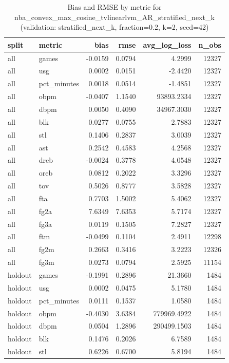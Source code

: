 \begin{table}
\caption{Bias and RMSE by metric for nba_convex_max_cosine_tvlinearlvm_AR_stratified_next_k (validation: stratified_next_k, fraction=0.2, k=2, seed=42)}
\label{tab:nba_convex_max_cosine_tvlinearlvm_AR_stratified_next_k_vs_stratified_next_k_f20_k2_s42_bias_rmse}
\begin{tabular}{llrrrr}
\toprule
split & metric & bias & rmse & avg\_log\_loss & n\_obs \\
\midrule
all & games & -0.0159 & 0.0794 & 4.2999 & 12327 \\
all & usg & 0.0002 & 0.0151 & -2.4420 & 12327 \\
all & pct\_minutes & 0.0018 & 0.0514 & -1.4851 & 12327 \\
all & obpm & -0.0407 & 1.1540 & 93893.2334 & 12327 \\
all & dbpm & 0.0050 & 0.4090 & 34967.3030 & 12327 \\
all & blk & 0.0277 & 0.0755 & 2.7883 & 12327 \\
all & stl & 0.1406 & 0.2837 & 3.0039 & 12327 \\
all & ast & 0.2542 & 0.4583 & 4.2568 & 12327 \\
all & dreb & -0.0024 & 0.3778 & 4.0548 & 12327 \\
all & oreb & 0.0812 & 0.2022 & 3.3296 & 12327 \\
all & tov & 0.5026 & 0.8777 & 3.5828 & 12327 \\
all & fta & 0.7703 & 1.5002 & 5.4062 & 12327 \\
all & fg2a & 7.6349 & 7.6353 & 5.7174 & 12327 \\
all & fg3a & 0.0119 & 0.1505 & 7.2827 & 12327 \\
all & ftm & -0.0499 & 0.1104 & 2.4911 & 12298 \\
all & fg2m & 0.2663 & 0.3416 & 3.2223 & 12326 \\
all & fg3m & 0.0273 & 0.0794 & 2.5925 & 11154 \\
holdout & games & -0.1991 & 0.2896 & 21.3660 & 1484 \\
holdout & usg & 0.0002 & 0.0475 & 5.1780 & 1484 \\
holdout & pct\_minutes & 0.0111 & 0.1537 & 1.0580 & 1484 \\
holdout & obpm & -0.4030 & 3.6384 & 779969.4922 & 1484 \\
holdout & dbpm & 0.0504 & 1.2896 & 290499.1503 & 1484 \\
holdout & blk & 0.1476 & 0.2026 & 6.7589 & 1484 \\
holdout & stl & 0.6226 & 0.6700 & 5.8194 & 1484 \\

\end{tabular}
\end{table}
